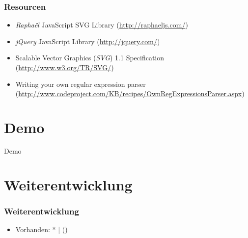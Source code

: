\documentclass[ignorenonframetext]{beamer}
\begin{document}
\begin{frame}
    \frametitle{Resourcen}

    \begin{itemize}
        \item \textit{Rapha\"el} JavaScript SVG Library (\url{http://raphaeljs.com/})
        \item \textit{jQuery} JavaScript Library (\url{http://jquery.com/})
        \item Scalable Vector Graphics (\textit{SVG}) 1.1 Specification (\url{http://www.w3.org/TR/SVG/})
        \item Writing your own regular expression parser (\url{http://www.codeproject.com/KB/recipes/OwnRegExpressionsParser.aspx})
    \end{itemize}
\end{frame}


\section{Demo}
\begin{frame}[plain]
    \begin{center}
        \Huge{Demo}
    \end{center}
\end{frame}


\section{Weiterentwicklung}
\begin{frame}
    \frametitle{Weiterentwicklung}

    \begin{itemize}
        \item Vorhanden: * | ()
    \end{itemize}
\end{frame}
\end{document}

